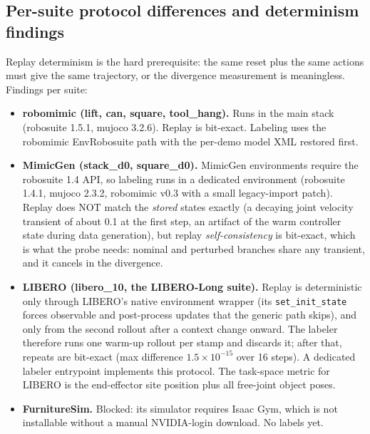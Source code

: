 \documentclass[11pt]{article}
\begin{document}
\subsection{Per-suite protocol differences and determinism findings}
\label{sec:suites}

Replay determinism is the hard prerequisite: the same reset plus the same actions must
give the same trajectory, or the divergence measurement is meaningless. Findings per
suite:

\begin{itemize}[leftmargin=2em]
  \item \textbf{robomimic (lift, can, square, tool\_hang).} Runs in the main stack
        (robosuite 1.5.1, mujoco 3.2.6). Replay is bit-exact. Labeling uses the
        robomimic EnvRobosuite path with the per-demo model XML restored first.
  \item \textbf{MimicGen (stack\_d0, square\_d0).} MimicGen environments require the
        robosuite 1.4 API, so labeling runs in a dedicated environment (robosuite
        1.4.1, mujoco 2.3.2, robomimic v0.3 with a small legacy-import patch).
        Replay does NOT match the \emph{stored} states exactly (a decaying joint
        velocity transient of about 0.1 at the first step, an artifact of the warm
        controller state during data generation), but replay
        \emph{self-consistency} is bit-exact, which is what the probe needs: nominal
        and perturbed branches share any transient, and it cancels in the
        divergence.
  \item \textbf{LIBERO (libero\_10, the LIBERO-Long suite).} Replay is deterministic
        only through LIBERO's native environment wrapper (its
        \texttt{set\_init\_state} forces observable and post-process updates that the
        generic path skips), and only from the second rollout after a context change
        onward. The labeler therefore runs one warm-up rollout per stamp and
        discards it; after that, repeats are bit-exact (max difference
        $1.5\times10^{-15}$ over 16 steps). A dedicated labeler entrypoint
        implements this protocol. The task-space metric for LIBERO is the
        end-effector site position plus all free-joint object poses.
  \item \textbf{FurnitureSim.} Blocked: its simulator requires Isaac Gym, which is
        not installable without a manual NVIDIA-login download. No labels yet.
\end{itemize}

\end{document}
